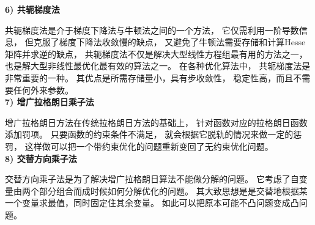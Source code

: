 \textbf{6) 共轭梯度法}

共轭梯度法是介于梯度下降法与牛顿法之间的一个方法，
它仅需利用一阶导数信息，
但克服了梯度下降法收敛慢的缺点，
又避免了牛顿法需要存储和计算Hesse矩阵并求逆的缺点，
共轭梯度法不仅是解决大型线性方程组最有用的方法之一，
也是解大型非线性最优化最有效的算法之一。
在各种优化算法中，
共轭梯度法是非常重要的一种。
其优点是所需存储量小，具有步收敛性，
稳定性高，而且不需要任何外来参数。\\

\textbf{7) 增广拉格朗日乘子法}

增广拉格朗日方法在传统拉格朗日方法的基础上，
针对函数对应的拉格朗日函数添加罚项。
只要函数的约束条件不满足，
就会根据它脱轨的情况来做一定的惩罚，
这样做可以把一个带约束优化的问题重新变回了无约束优化问题。\\

\textbf{8) 交替方向乘子法}

交替方向乘子法是为了解决增广拉格朗日算法不能做分解的问题。
它考虑了自变量由两个部分组合而成时候如何分解优化的问题。
其大致思想是是交替地根据某一个变量求最值，同时固定住其余变量。
如此可以把原本可能不凸问题变成凸问题。\\